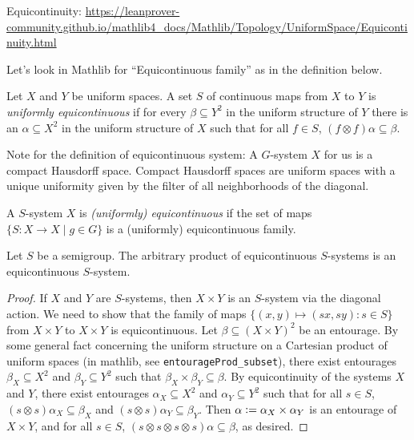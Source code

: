 \begin{leanrmk}
    Equicontinuity: \url{https://leanprover-community.github.io/mathlib4_docs/Mathlib/Topology/UniformSpace/Equicontinuity.html}

    Let's look in Mathlib for ``Equicontinuous family'' as in the definition below.
\end{leanrmk}

\begin{definition}
     Let $X$ and $Y$ be uniform spaces.  A set $S$ of continuous maps from $X$ to $Y$ is \emph{uniformly equicontinuous} if for every $\beta \subseteq Y^2$ in the uniform structure of $Y$ there is an $\alpha \subseteq X^2$ in the uniform structure of $X$ such that for all $f \in S$, $(f \otimes f)\alpha \subseteq \beta$.
\end{definition}

Note for the definition of equicontinuous system: A $G$-system $X$ for us is a compact Hausdorff space.  Compact Hausdorff spaces are uniform spaces with a unique uniformity given by the filter of all neighborhoods of the diagonal.

\begin{definition}
    \leanok{}
    A $S$-system $X$ is \emph{(uniformly) equicontinuous} if the set of maps $\{S: X \to X \mid g \in G\}$ is a (uniformly) equicontinuous family.
\end{definition}

\begin{lemma}
    \label{lemma_arbitrary_product_of_equi_is_equi}
    Let $S$ be a semigroup.  The arbitrary product of equicontinuous $S$-systems is an equicontinuous $S$-system.
\end{lemma}

\begin{proof}
     If $X$ and $Y$ are $S$-systems, then $X \times Y$ is an $S$-system via the diagonal action.  We need to show that the family of maps $\{(x,y) \mapsto (sx,sy) : s \in S\}$ from $X \times Y$ to $X \times Y$ is equicontinuous. Let $\beta \subseteq (X \times Y)^2$ be an entourage.  By some general fact concerning the uniform structure on a Cartesian product of uniform spaces (in mathlib, see \verb|entourageProd_subset|), there exist entourages $\beta_X \subseteq X^2$ and $\beta_Y \subseteq Y^2$ such that $\beta_X \times \beta_Y \subseteq \beta$. By equicontinuity of the systems $X$ and $Y$, there exist entourages $\alpha_X \subseteq X^2$ and $\alpha_Y \subseteq Y^2$ such that for all $s \in S$, $(s \otimes s) \alpha_X \subseteq \beta_X$ and $(s \otimes s) \alpha_Y \subseteq \beta_Y$. Then $
    \alpha \vcentcolon= \alpha_X \times \alpha_Y$ is an entourage of $X \times Y$, and for all $s \in S$, $(s \otimes s \otimes s \otimes s)\alpha \subseteq \beta$, as desired.
\end{proof}

